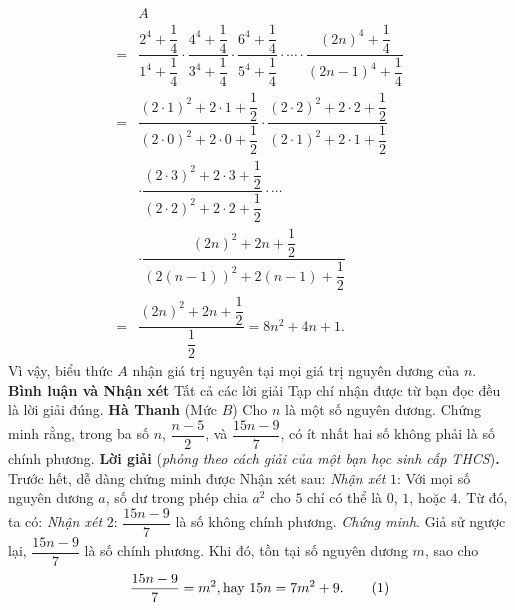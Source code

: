 \begin{multicols}{2}
\begin{align*}
			&A \\[-0.5ex]
			= &\dfrac{{{2^4} \!+\! \dfrac{1}{4}}}{{{1^4} \!+\! \dfrac{1}{4}}} \!\cdot\! \dfrac{{{4^4} \!+\! \dfrac{1}{4}}}{{{3^4} \!+\! \dfrac{1}{4}}} \!\cdot\! \dfrac{{{6^4} \!+\! \dfrac{1}{4}}}{{{5^4} \!+\! \dfrac{1}{4}}} \cdot  \cdots  \cdot \dfrac{{{{\left( {2n} \right)}^4} \!+\! \dfrac{1}{4}}}{{{{\left( {2n \!-\! 1} \right)}^4} \!+\! \dfrac{1}{4}}}\\
			 = &\dfrac{{{{\left( {2 \cdot 1} \right)}^2} + 2 \cdot 1 + \dfrac{1}{2}}}{{{{\left( {2 \cdot 0} \right)}^2} + 2 \cdot 0 + \dfrac{1}{2}}} \cdot \dfrac{{{{\left( {2 \cdot 2} \right)}^2} + 2 \cdot 2 + \dfrac{1}{2}}}{{{{\left( {2 \cdot 1} \right)}^2} + 2 \cdot 1 + \dfrac{1}{2}}} \\
			 &\cdot \dfrac{{{{\left( {2 \cdot 3} \right)}^2} + 2 \cdot 3 + \dfrac{1}{2}}}{{{{\left( {2 \cdot 2} \right)}^2} + 2 \cdot 2 + \dfrac{1}{2}}} \cdot  \cdots  \\
			 &\cdot \dfrac{{{{\left( {2n} \right)}^2} + 2n + \dfrac{1}{2}}}{{{{\left( {2\left( {n - 1} \right)} \right)}^2} + 2\left( {n - 1} \right) + \dfrac{1}{2}}}\\
			 = &\dfrac{{{{\left( {2n} \right)}^2} + 2n + \dfrac{1}{2}}}{{\dfrac{1}{2}}} = 8{n^2} + 4n + 1.
	\end{align*}
	Vì vậy, biểu thức $A$ nhận giá trị nguyên tại mọi giá trị nguyên dương của $n$.
	\vskip 0.05cm
	\textbf{\color{thachthuctoanhoc}Bình luận và Nhận xét}
	\vskip 0.05cm
	Tất cả các lời giải Tạp chí nhận được từ bạn đọc đều là lời giải đúng.
	\vskip 0.05cm
	\hfill	\textbf{\color{thachthuctoanhoc}Hà Thanh}
	\vskip 0.05cm
	{}
	(Mức $B$) Cho $n$ là một số nguyên dương. Chứng minh rằng, trong ba số $n$,  $\dfrac{n-5}2$, và $\dfrac{15n-9}7$, có ít nhất hai số không phải là số chính phương.
	\vskip 0.05cm
	\textbf{\color{thachthuctoanhoc}Lời giải} (\textit{phỏng theo cách giải của một bạn học sinh cấp THCS})\textbf{\color{thachthuctoanhoc}.}
	\vskip 0.05cm
	Trước hết, dễ dàng chứng minh được Nhận xét sau:
	\vskip 0.05cm
	\textit{Nhận xét} $1$: Với mọi số nguyên dương $a$, số dư trong phép chia $a^2$  cho $5$ chỉ có thể là $0$, $1$, hoặc $4$.
	\vskip 0.05cm
	Từ đó, ta có:
	\vskip 0.05cm
	\textit{Nhận xét} $2$: $\dfrac{15n-9}{7}$  là số không chính phương.
	\vskip 0.05cm
	\textit{Chứng minh}. Giả sử ngược lại, $\dfrac{15n-9}{7}$  là số chính phương.
	\vskip 0.05cm
	Khi đó, tồn tại số nguyên dương $m$, sao cho
	\begin{align*}
		\dfrac{{15n - 9}}{7} = {m^2}, \text{\color{
	black} hay } 15n = 7{m^2} + 9. \tag{$1$}

\end{align*}
\end{multicols}
